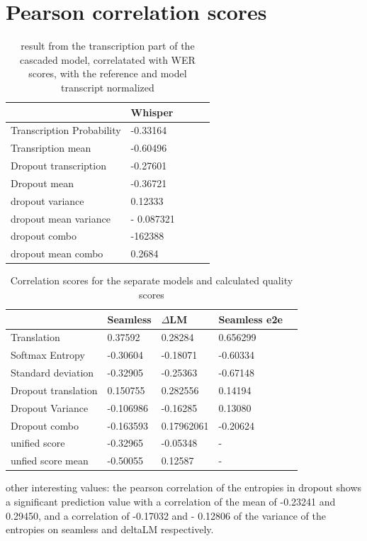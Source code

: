 \section{Pearson correlation scores}

\begin{table}[ht]
\centering%
  \begin{tabular}
  {l|llll}
  &  Whisper \\ \hline
  Transcription Probability& -0.33164 \\
  Transription mean & -0.60496 \\ \hline
  Dropout transcription & -0.27601 \\
  Dropout mean & -0.36721 \\
  dropout variance &  0.12333\\
  dropout mean variance & - 0.087321\\
  dropout combo& -162388\\
  dropout mean combo & 0.2684\\
  \end{tabular}

  \caption{result from the transcription part of the cascaded model, correlatated with WER scores, with the reference and model transcript normalized}
    \label{transcription results}
\end{table}

\begin{table}[ht]
\centering%
\begin{tabular}{l|llll}
    & Seamless & $\Delta$LM&  Seamless e2e\\ \hline
Translation & 0.37592 & 0.28284 & 0.656299\\ 
Softmax Entropy & -0.30604   &-0.18071 & -0.60334 \\
Standard deviation & -0.32905  & -0.25363& -0.67148 \\ \hline

Dropout translation & 0.150755& 0.282556& 0.14194\\

Dropout Variance &-0.106986 & -0.16285& 0.13080\\
Dropout combo & -0.163593& 0.17962061& -0.20624\\
\hline
unified score   & -0.32965 & -0.05348 &-\\
unfied score mean& -0.50055& 0.12587& - 


\end{tabular}

\caption{Correlation scores for the separate models and calculated quality scores}
\label{results}
\end{table}

other interesting values: the pearson correlation of the entropies in dropout shows a significant prediction value with a correlation of the mean of -0.23241 and 0.29450, and a correlation of -0.17032 and - 0.12806 of the variance of the entropies on seamless and deltaLM respectively.
